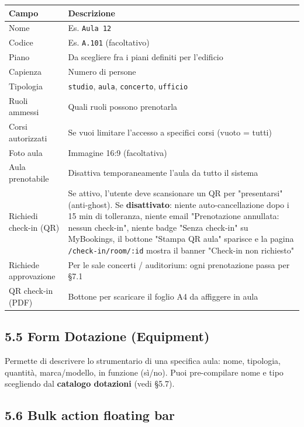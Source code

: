 \documentclass[11pt,a4paper]{article}
\begin{document}
\begin{table}[H]
\centering
\small
\begin{tabularx}{\linewidth}{|X|X|}
\hline
\rowcolor{tableheader} Campo & Descrizione \\
\hline
Nome & Es. \texttt{Aula 12} \\
\hline
Codice & Es. \texttt{A.101} (facoltativo) \\
\hline
Piano & Da scegliere fra i piani definiti per l'edificio \\
\hline
Capienza & Numero di persone \\
\hline
Tipologia & \texttt{studio}, \texttt{aula}, \texttt{concerto}, \texttt{ufficio} \\
\hline
Ruoli ammessi & Quali ruoli possono prenotarla \\
\hline
Corsi autorizzati & Se vuoi limitare l'accesso a specifici corsi (vuoto = tutti) \\
\hline
Foto aula & Immagine 16:9 (facoltativa) \\
\hline
Aula prenotabile & Disattiva temporaneamente l'aula da tutto il sistema \\
\hline
Richiedi check-in (QR) & Se attivo, l'utente deve scansionare un QR per "presentarsi" (anti-ghost). Se \textbf{disattivato}: niente auto-cancellazione dopo i 15 min di tolleranza, niente email "Prenotazione annullata: nessun check-in", niente badge "Senza check-in" su MyBookings, il bottone "Stampa QR aula" sparisce e la pagina \texttt{/check-in/room/:id} mostra il banner "Check-in non richiesto" \\
\hline
Richiede approvazione & Per le sale concerti / auditorium: ogni prenotazione passa per §7.1 \\
\hline
QR check-in (PDF) & Bottone per scaricare il foglio A4 da affiggere in aula \\
\hline
\end{tabularx}
\end{table}


\subsection{5.5 Form Dotazione (Equipment)}


Permette di descrivere lo strumentario di una specifica aula: nome, tipologia, quantità, marca/modello, in funzione (sì/no). Puoi pre-compilare nome e tipo scegliendo dal \textbf{catalogo dotazioni} (vedi §5.7).

\subsection{5.6 Bulk action floating bar}
\end{document}
